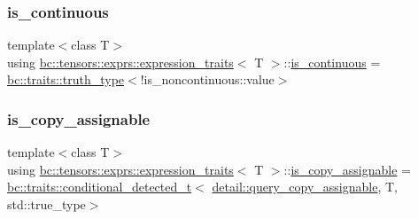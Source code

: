 \mbox{\label{structbc_1_1tensors_1_1exprs_1_1expression__traits_af63d98e5f071259f2b90677629991c2a}} 
\subsubsection{\texorpdfstring{is\+\_\+continuous}{is\_continuous}}
{\footnotesize\ttfamily template$<$class T$>$ \\
using \hyperlink{structbc_1_1tensors_1_1exprs_1_1expression__traits}{bc\+::tensors\+::exprs\+::expression\+\_\+traits}$<$ T $>$\+::\hyperlink{structbc_1_1tensors_1_1exprs_1_1expression__traits_af63d98e5f071259f2b90677629991c2a}{is\+\_\+continuous} =  \hyperlink{namespacebc_1_1traits_ac91a9795000ae7f483efbaf74c9872e8}{bc\+::traits\+::truth\+\_\+type}$<$!is\+\_\+noncontinuous\+::value$>$}

\mbox{\label{structbc_1_1tensors_1_1exprs_1_1expression__traits_ae5b90ffbe5ee242543685ac0905d8aec}} 
\subsubsection{\texorpdfstring{is\+\_\+copy\+\_\+assignable}{is\_copy\_assignable}}
{\footnotesize\ttfamily template$<$class T$>$ \\
using \hyperlink{structbc_1_1tensors_1_1exprs_1_1expression__traits}{bc\+::tensors\+::exprs\+::expression\+\_\+traits}$<$ T $>$\+::\hyperlink{structbc_1_1tensors_1_1exprs_1_1expression__traits_ae5b90ffbe5ee242543685ac0905d8aec}{is\+\_\+copy\+\_\+assignable} =  \hyperlink{namespacebc_1_1traits_a1a6d378947ec32acd457890854bcd592}{bc\+::traits\+::conditional\+\_\+detected\+\_\+t}$<$ \hyperlink{namespacebc_1_1tensors_1_1exprs_1_1detail_a48ce13185316802e0ca8ad8cee7d5870}{detail\+::query\+\_\+copy\+\_\+assignable}, T, std\+::true\+\_\+type$>$}

